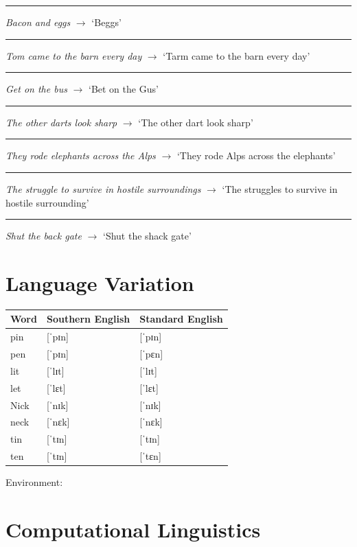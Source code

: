 \documentclass[addpoints]{exam}
\begin{document}
\begin{questions}
        \question[1] \rule{4cm}{0.4pt} \textit{Bacon and eggs} $\rightarrow$ `Beggs'
        \question[1] \rule{4cm}{0.4pt} \textit{Tom came to the barn every day} $\rightarrow$ `Tarm came to the barn every day'
        \question[1] \rule{4cm}{0.4pt} \textit{Get on the bus} $\rightarrow$ `Bet on the Gus'
        \question[1] \rule{4cm}{0.4pt} \textit{The other darts look sharp} $\rightarrow$ `The other dart look sharp'
        \question[1] \rule{4cm}{0.4pt} \textit{They rode elephants across the Alps} $\rightarrow$ `They rode Alps across the elephants'
        \question[1] \rule{4cm}{0.4pt} \textit{The struggle to survive in hostile surroundings} $\rightarrow$ `The struggles to survive in hostile surrounding'
        \question[1] \rule{4cm}{0.4pt} \textit{Shut the back gate} $\rightarrow$ `Shut the shack gate'

    \section{Language Variation}
      \begin{tabular}{l l l}
        Word & Southern English & Standard English \\
        \hline
        pin  & [ˈpɪn]           & [ˈpɪn] \\
        pen  & [ˈpɪn]           & [ˈpɛn] \\
        lit  & [ˈlɪt]           & [ˈlɪt] \\
        let  & [ˈlɛt]           & [ˈlɛt] \\
        Nick & [ˈnɪk]           & [ˈnɪk] \\
        neck & [ˈnɛk]           & [ˈnɛk] \\
        tin  & [ˈtɪn]           & [ˈtɪn] \\
        ten  & [ˈtɪn]           & [ˈtɛn]
      \end{tabular}
        \question[2] Environment: \hrulefill


    \section{Computational Linguistics}
        


\end{questions}
\end{document}
